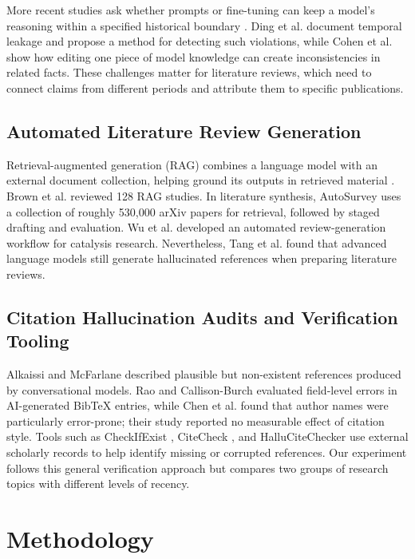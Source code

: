 \documentclass[manuscript,screen]{acmart}
\begin{document}
More recent studies ask whether prompts or fine-tuning can keep a model's reasoning within a specified historical boundary \cite{gao2025rewind, ding2026when, asai2026constrained}. Ding et al. \cite{ding2026when} document temporal leakage and propose a method for detecting such violations, while Cohen et al. \cite{cohen2024ripple} show how editing one piece of model knowledge can create inconsistencies in related facts. These challenges matter for literature reviews, which need to connect claims from different periods and attribute them to specific publications.

\subsection{Automated Literature Review Generation}
Retrieval-augmented generation (RAG) combines a language model with an external document collection, helping ground its outputs in retrieved material \cite{lewis2020rag}. Brown et al. \cite{brown2025rag} reviewed 128 RAG studies. In literature synthesis, AutoSurvey \cite{wang2024autosurvey} uses a collection of roughly 530,000 arXiv papers for retrieval, followed by staged drafting and evaluation. Wu et al. \cite{wu2025automated} developed an automated review-generation workflow for catalysis research. Nevertheless, Tang et al. \cite{tang2025automated} found that advanced language models still generate hallucinated references when preparing literature reviews.

\subsection{Citation Hallucination Audits and Verification Tooling}
Alkaissi and McFarlane \cite{alkaissi2023artificial} described plausible but non-existent references produced by conversational models. Rao and Callison-Burch \cite{rao2026bibtex} evaluated field-level errors in AI-generated BibTeX entries, while Chen et al. \cite{chen2026neurons} found that author names were particularly error-prone; their study reported no measurable effect of citation style. Tools such as CheckIfExist \cite{abbonato2026checkifexist}, CiteCheck \cite{khajavi2026citecheck}, and HalluCiteChecker \cite{sakai2026hallucitechecker} use external scholarly records to help identify missing or corrupted references. Our experiment follows this general verification approach but compares two groups of research topics with different levels of recency.

\section{Methodology}
\end{document}
